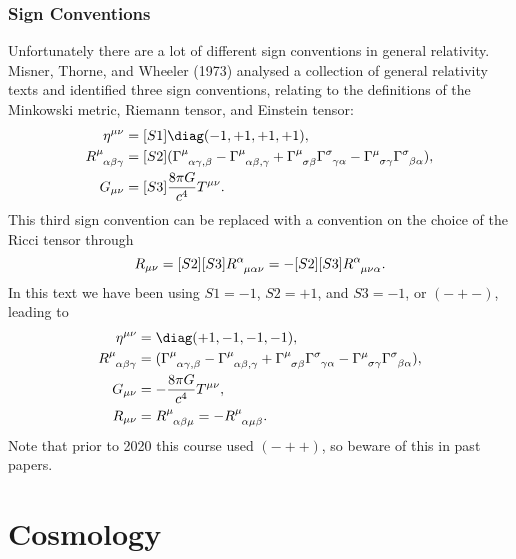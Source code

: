 \documentclass[fleqn]{NotesClass}
\newcommand*{\christoffel}[3]{\tensor{\Gamma}{^{#1}_{{#2}{#3}}}}
\begin{document}
    \subsection{Sign Conventions}
    Unfortunately there are a lot of different sign conventions in general relativity.
    Misner, Thorne, and Wheeler (1973) analysed a collection of general relativity texts and identified three sign conventions, relating to the definitions of the Minkowski metric, Riemann tensor, and Einstein tensor:
    \begin{align}
        \eta^{\mu\nu} &= [S1] \diag(-1, +1, +1, +1),\\
        \tensor{R}{^\mu_{\alpha\beta\gamma}} &= [S2] (\tensor{\Gamma}{^\mu_{\alpha\gamma,\beta}} - \tensor{\Gamma}{^\mu_{\alpha\beta,\gamma}} + \christoffel{\mu}{\sigma}{\beta}\christoffel{\sigma}{\gamma}{\alpha} - \christoffel{\mu}{\sigma}{\gamma}\christoffel{\sigma}{\beta}{\alpha}),\\
        G_{\mu\nu} &= [S3] \frac{8\pi G}{c^4}T^{\mu\nu}.
    \end{align}
    This third sign convention can be replaced with a convention on the choice of the Ricci tensor through
    \begin{equation}
        R_{\mu\nu} = [S2][S3] \tensor{R}{^\alpha_{\mu\alpha\nu}} = -[S2][S3] \tensor{R}{^\alpha_{\mu\nu\alpha}}.
    \end{equation}
    In this text we have been using \(S1 = -1\), \(S2 = +1\), and \(S3 = -1\), or \(({-}{+}{-})\), leading to
    \begin{align}
        \eta^{\mu\nu} &= \diag(+1, -1, -1, -1),\\
        \tensor{R}{^\mu_{\alpha\beta\gamma}} &= (\tensor{\Gamma}{^\mu_{\alpha\gamma,\beta}} - \tensor{\Gamma}{^\mu_{\alpha\beta,\gamma}} + \christoffel{\mu}{\sigma}{\beta}\christoffel{\sigma}{\gamma}{\alpha} - \christoffel{\mu}{\sigma}{\gamma}\christoffel{\sigma}{\beta}{\alpha}),\\
        G_{\mu\nu} &= -\frac{8\pi G}{c^4}T^{\mu\nu},\\
        R_{\mu\nu} &= \tensor{R}{^\mu_{\alpha\beta\mu}} = -\tensor{R}{^\mu_{\alpha\mu\beta}}.
    \end{align}
    Note that prior to 2020 this course used \(({-}{+}{+})\), so beware of this in past papers.
    
    \chapter{Cosmology}
\end{document}
